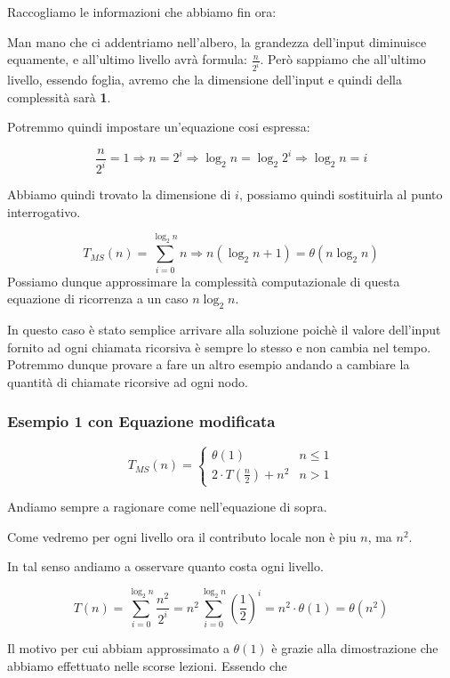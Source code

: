 Raccogliamo le informazioni che abbiamo fin ora:


Man mano che ci addentriamo nell'albero, la grandezza dell'input diminuisce equamente, e all'ultimo livello avrà formula: $\frac{n}{2^i}$. Però sappiamo che all'ultimo livello, essendo foglia, avremo che la dimensione dell'input e quindi della complessità sarà \textbf{1}.\smallskip

Potremmo quindi impostare un'equazione cosi espressa:

$$\frac{n}{2^i} = 1 \Rightarrow n = 2^i \Rightarrow \log_2 n = \log_2 2^i \Rightarrow \log_2 n = i$$\smallskip

Abbiamo quindi trovato la dimensione di $i$, possiamo quindi sostituirla al punto interrogativo. 

$$ T_{MS}(n)=\sum_{i=0}^{\log_2 n} n \Rightarrow n(\log_2 n+1) = \theta(n\log_2 n)$$
Possiamo dunque approssimare la complessità computazionale di questa equazione di ricorrenza a un caso $n\log_2 n$. 
\smallskip

In questo caso è stato semplice arrivare alla soluzione poichè il valore dell'input fornito ad ogni chiamata ricorsiva è sempre lo stesso e non cambia nel tempo. Potremmo dunque provare a fare un altro esempio andando a cambiare la quantità di chiamate ricorsive ad ogni nodo.

\smallskip

\subsubsection{Esempio 1 con Equazione modificata}

$$T_{MS}(n)= \left\{ \begin{array}{rcl}
    \theta(1) &  n\le1\\
    2 \cdot T(\frac{n}{2})+n^2 & n>1
    \end{array}\right.$$
\smallskip

Andiamo sempre a ragionare come nell'equazione di sopra.


Come vedremo per ogni livello ora il contributo locale non è piu $n$, ma $n^2$.

In tal senso andiamo a osservare quanto costa ogni livello.


$$T(n) = \sum_{i=0}^{\log_2 n} \frac{n^2}{2^i} = n^2\sum_{i=0}^{\log_2 n} (\frac{1}{2})^i = n^2 \cdot \theta(1) = \theta(n^2)$$

Il motivo per cui abbiam approssimato a $\theta(1)$ è grazie alla dimostrazione che abbiamo effettuato nelle scorse lezioni. Essendo che 





